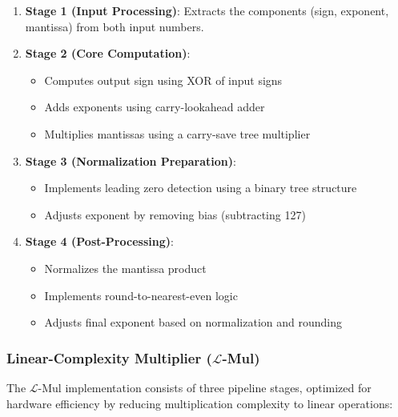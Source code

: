 \documentclass[12pt,letterpaper]{article}
\newcommand{\lmul}{$\mathcal{L}$-Mul\xspace}
\begin{document}
\begin{enumerate}
    \item \textbf{Stage 1 (Input Processing)}: Extracts the components (sign, exponent, mantissa) from both input numbers.
    
    \item \textbf{Stage 2 (Core Computation)}:
    \begin{itemize}
        \item Computes output sign using XOR of input signs
        \item Adds exponents using carry-lookahead adder
        \item Multiplies mantissas using a carry-save tree multiplier
    \end{itemize}
    
    \item \textbf{Stage 3 (Normalization Preparation)}:
    \begin{itemize}
        \item Implements leading zero detection using a binary tree structure
        \item Adjusts exponent by removing bias (subtracting 127)
    \end{itemize}
    
    \item \textbf{Stage 4 (Post-Processing)}:
    \begin{itemize}
        \item Normalizes the mantissa product
        \item Implements round-to-nearest-even logic
        \item Adjusts final exponent based on normalization and rounding
    \end{itemize}
\end{enumerate}

\subsubsection{Linear-Complexity Multiplier (\lmul)}

The \lmul implementation consists of three pipeline stages, optimized for hardware efficiency by reducing multiplication complexity to linear operations:
\end{document}
